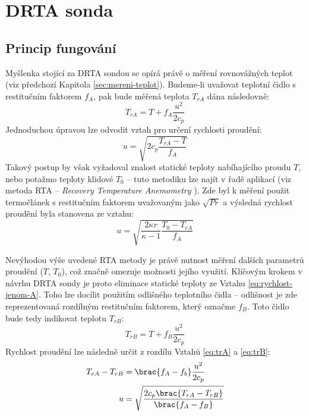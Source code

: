 \section{DRTA sonda}
    \subsection{Princip fungování} \label{sec:DRTA-princip}
        Myšlenka stojící za DRTA sondou se opírá právě o měření rovnovážných teplot (viz předchozí Kapitola \ref{sec:mereni-teplot}). Budeme-li uvažovat teplotní čidlo s restitučním faktorem $f_A$, pak bude měřená teplota $T_{rA}$ dána následovně:
        \begin{equation} \label{eq:trA}
            T_{rA} = T + f_A \frac{u^2}{2 c_p}
        \end{equation}
        \noindent Jednoduchou úpravou lze odvodit vztah pro určení rychlosti proudění:
        \begin{equation} \label{eq:rychlost-jenom-A}
            u = \sqrt{2 c_p \frac{T_{rA} - T}{f_A}}
        \end{equation}
        Takový postup by však vyžadoval znalost statické teploty nabíhajícího proudu $T$, nebo potažmo teploty klidové $T_0$ – tuto metodiku lze najít v řadě aplikací (viz metoda RTA – \textit{Recovery Temperature Anemometry} \cite{Ishibashi2004, Ishibashi2012}). Zde byl k měření použit termočlánek s restitučním faktorem uvažovaným jako $\sqrt{Pr}$ a výsledná rychlost proudění byla stanovena ze vztahu:
        \begin{equation}
            u = \sqrt{\frac{2 \kappa r}{\kappa - 1} \frac{T_0 - T_{rA}}{f_A}}
        \end{equation}
        
        Nevýhodou výše uvedené RTA metody je právě nutnost měření dalších parametrů proudění ($T$, $T_0$), což značně omezuje možnosti jejího využití. Klíčovým krokem v návrhu DRTA sondy je proto eliminace statické teploty ze Vztahu \ref{eq:rychlost-jenom-A}. Toho lze docílit použitím odlišného teplotního čidla – odlišnost je zde reprezentovaná rozdílným restitučním faktorem, který označme $f_B$. Toto čidlo bude tedy indikovat teplotu $T_{rB}$:
        \begin{equation} \label{eq:trB}
            T_{rB} = T + f_B \frac{u^2}{2 c_p}
        \end{equation}
        \noindent Rychlost proudění lze následně určit z rozdílu Vztahů \ref{eq:trA} a \ref{eq:trB}:
        \begin{align} \label{eq:mereni-rychlosti}
                T_{rA} - T_{rB} &= \brac{f_A - f_b} \frac{u^2}{2 c_p} \\
                u &= \sqrt{\frac{2 c_p \brac{T_{rA} - T_{rB}}}{\brac{f_A - f_B}}}
        \end{align}

